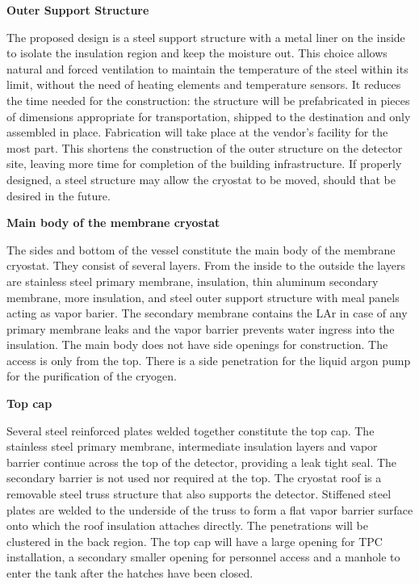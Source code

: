 \textbf{Outer Support Structure}

The proposed design is a steel support structure with a metal liner on the inside to isolate the insulation region and keep the moisture out. This choice allows natural and forced ventilation to maintain the temperature of the steel within its limit, without the need of heating elements and temperature sensors. It reduces the time needed for the construction: the structure will be prefabricated in pieces of dimensions appropriate for transportation, shipped to the destination and only assembled in place. Fabrication will take place at the vendor’s facility for the most part. This shortens the construction of the outer structure on the detector site, leaving more time for completion of the building infrastructure. If properly designed, a steel structure may allow the cryostat to be moved, should that be desired in the future.

\textbf{Main body of the membrane cryostat}

The sides and bottom of the vessel constitute the main body of the membrane cryostat. They consist of several layers. From the inside to the outside the layers are stainless steel primary membrane, insulation, thin aluminum secondary membrane, more insulation, and steel outer support structure with meal panels acting as vapor barier. The secondary membrane contains the LAr in case of any primary membrane leaks and the vapor barrier prevents water ingress into the insulation. The main body does not have side openings for construction. The access is only from the top. There is a side penetration for the liquid argon pump for the purification of the cryogen.

\textbf{Top cap}

Several steel reinforced plates welded together constitute the top cap. The stainless steel primary 
membrane, intermediate insulation layers and vapor barrier continue across the top of the detector, 
providing a leak tight seal. The secondary barrier is not used nor required at the top. The cryostat roof is 
a removable steel truss structure that also supports the detector. Stiffened steel plates are welded to the 
underside of the truss to form a flat vapor barrier surface onto which the roof insulation attaches directly. 
The penetrations will be clustered in the back region. The top cap will have a large opening for TPC 
installation, a secondary smaller opening for personnel access and a manhole to enter the tank after the 
hatches have been closed.

